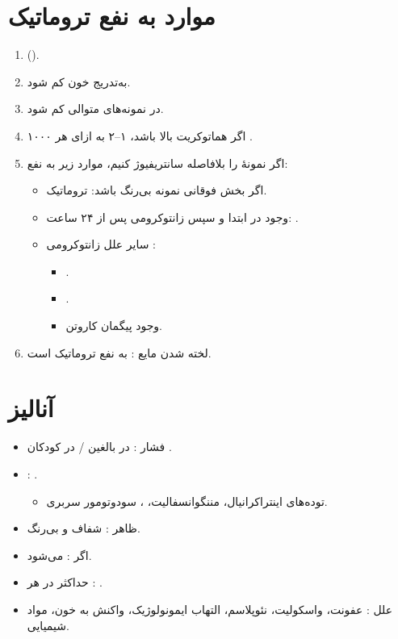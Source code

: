 \documentclass[a4paper,12pt]{extbook}
\begin{document}
\section*{موارد به نفع  تروماتیک}
\begin{enumerate}[label=\protect\PCen{\alph*)}]
\item {} ().
\item به‌تدریج خون کم شود.
\item در نمونه‌های متوالی  کم شود.
\item اگر هماتوکریت بالا باشد، ۱–۲  به ازای هر ۱۰۰۰ .
\item اگر نمونهٔ  را بلافاصله سانتریفیوژ کنیم، موارد زیر به نفع:
  \begin{itemize}
  \item اگر بخش فوقانی نمونه بی‌رنگ باشد:  تروماتیک.
  \item وجود  در ابتدا و سپس زانتوکرومی پس از ۲۴ ساعت: .
  \item سایر علل زانتوکرومی :
    \begin{itemize}
    \item {}.
    \item {}.
    \item وجود پیگمان کاروتن.
    \end{itemize}
  \end{itemize}
\setcounter{enumi}{6}
\item لخته شدن مایع : به نفع  تروماتیک است.
\end{enumerate}

\section*{آنالیز }
\begin{itemize}
\item فشار : در بالغین  / در کودکان .
\item {}: .
  \begin{itemize}
  \item توده‌های اینتراکرانیال، مننگوانسفالیت، ، سودوتومور سربری.
  \end{itemize}
\item ظاهر : شفاف و بی‌رنگ.
\item اگر :  می‌شود.
\item حداکثر  در هر : .
\item علل : عفونت، واسکولیت، نئوپلاسم، التهاب ایمونولوژیک، واکنش به خون، مواد شیمیایی.
\end{itemize}
\end{document}
